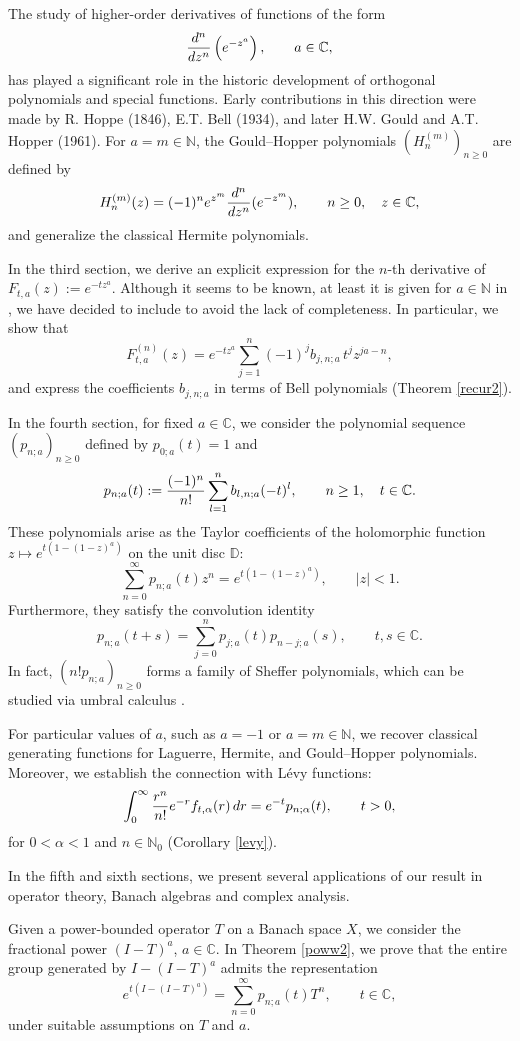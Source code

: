 \documentclass[a4paper,12pt]{amsart}
\def\N{\mathbb N}
\def\NN{\mathbb N}
\def\CC{\mathbb C}
\def\CC{\mathbb C}
\theoremstyle{definition}
\theoremstyle{remark}
\begin{document}
The study of higher-order derivatives of functions of the form
$$
{d^{n}\over dz^n}\left(e^{ -z^{a}}\right), \qquad a\in \CC,
$$
has played a significant role in the historic development of orthogonal polynomials and special functions. Early contributions in this direction were made by R. Hoppe (1846), E.T. Bell (1934), and later H.W. Gould and A.T. Hopper (1961). For $a=m\in \N$, the Gould--Hopper polynomials $(H_n^{(m)})_{n\ge 0}$ are defined by
$$
H_n^{(m)}(z)= (-1)^n e^{z^m}{d^n\over dz^n}(e^{-{z^m}}), \qquad n\ge 0, \quad z\in \CC,
$$
and generalize the classical Hermite polynomials.

In the third section, we derive an explicit expression for the $n$-th derivative of $F_{t,a}(z):=e^{-t z^{a}}$. Although it seems to be known, at least it is given for $a\in \N$ in \cite{B}, we have decided to include to avoid the lack of completeness. In particular, we show that
$$
F^{(n)}_{t,a}(z)=e^{-t z^{a}}
\sum_{j=1}^{n}
(-1)^{j}b_{j,n;a}\,t^j z^{ja-n},
$$
and express the coefficients $b_{j,n;a}$ in terms of Bell polynomials (Theorem \ref{recur2}).

In the fourth section, for fixed $a\in \CC$, we consider the polynomial sequence $(p_{n;a})_{n\ge 0}$ defined by $p_{0;a}(t)=1$ and
$$
p_{n;a}(t):={(-1)^n\over n!}\sum_{l=1}^n b_{l,n;a}(-t)^l, \qquad n \ge 1,\quad t\in \CC.
$$
These polynomials arise as the Taylor coefficients of the holomorphic function $z\mapsto e^{t(1-(1-z)^a)}$ on the unit disc $\mathbb{D}$:
$$
\sum_{n=0}^\infty p_{n;a}(t)z^n=e^{t(1-(1-z)^a)}, \qquad \vert z\vert<1.
$$
Furthermore, they satisfy the convolution identity
$$
p_{n;a}(t+s)=\sum_{j=0}^n p_{j;a}(t)p_{n-j;a}(s), \qquad t,s\in \CC.
$$
In fact, $(n! p_{n;a})_{n\ge 0}$ forms a family of Sheffer polynomials, which can be studied via umbral calculus \cite{CG, Roman}.

For particular values of $a$, such as $a=-1$ or $a=m\in \NN$, we recover classical generating functions for Laguerre, Hermite, and Gould--Hopper polynomials. Moreover, we establish the connection with L\'{e}vy functions:
$$
\int_0^\infty {r^n\over n!}e^{-r}f_{t,\alpha}(r)\,dr= e^{-t}p_{n;\alpha}(t), \qquad t>0,
$$
for $0<\alpha<1$ and $n\in \NN_0$ (Corollary \ref{levy}).

In the fifth and sixth sections, we present several applications of our result in operator theory,  Banach algebras and  complex analysis.

Given a power-bounded operator $T$ on a Banach space $X$, we consider the fractional power $(I-T)^a$, $a\in \CC$. In Theorem \ref{poww2}, we prove that the entire group generated by $I-(I-T)^a$ admits the representation
$$
e^{t(I-(I-T)^a)}=\sum_{n=0}^\infty p_{n;a}(t)T^n, \qquad t\in \CC,
$$
under suitable assumptions on $T$ and $a$.
\end{document}
